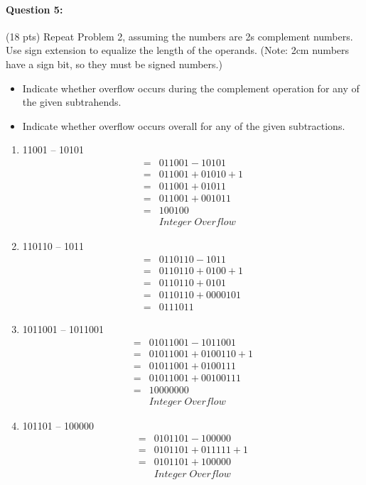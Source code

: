 \documentclass[12pt,letterpaper,titlepage]{report}
\begin{document}
\begin{raggedright}
\paragraph{Question 5:}
(18 pts) Repeat Problem 2, assuming the numbers are 2s complement numbers. Use sign extension to equalize the length of the operands. (Note: 2cm numbers have a sign bit, so they must be signed numbers.) 
\begin{itemize}
\item Indicate whether overflow occurs during the complement operation for any of the given subtrahends.   
\item Indicate whether overflow occurs overall for any of the given subtractions. 
\end{itemize}
\begin{multicols}{2}
\begin{enumerate} [label=\alph*)]
\item 11001 – 10101
\begin{align*}
  =& 011001 - 10101
\\=& 011001 + 01010 + 1
\\=& 011001 + 01011
\\=& 011001 + 001011
\\=& 100100
\\ & Integer\;Overflow
\end{align*}
\item 110110 – 1011
\begin{align*}
  =& 0110110 - 1011
\\=& 0110110 + 0100 + 1
\\=& 0110110 + 0101
\\=& 0110110 + 0000101
\\=& 0111011
\end{align*}
\item 1011001 – 1011001
\begin{align*}
  =& 01011001 - 1011001
\\=& 01011001 + 0100110 + 1
\\=& 01011001 + 0100111
\\=& 01011001 + 00100111
\\=& 10000000
\\ & Integer\;Overflow
\end{align*}
\item 101101 – 100000
\begin{align*}
  =& 0101101 - 100000
\\=& 0101101 + 011111 + 1
\\=& 0101101 + 100000
\\ & Integer\;Overflow

\end{align*}
\end{enumerate}
\end{multicols}
\end{raggedright}
\end{document}
